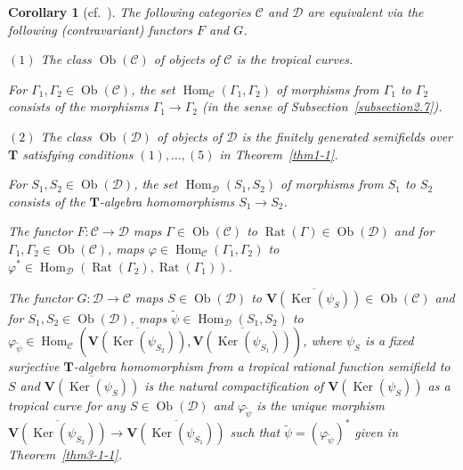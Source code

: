 \documentclass[a4paper,12pt]{amsart}
\newtheorem{cor}[dfn]{Corollary}
\def\Gamma{\varGamma}
\begin{document}
\begin{cor}[cf.~{\cite[Corollary~3.20]{JuAe5}}]
    \label{cor3-1-1}
The following categories $\mathscr{C}$ and $\mathscr{D}$ are equivalent via the following (contravariant) functors $F$ and $G$.

$(1)$ The class $\operatorname{Ob}(\mathscr{C})$ of objects of $\mathscr{C}$ is the tropical curves.

For $\Gamma_1, \Gamma_2 \in \operatorname{Ob}(\mathscr{C})$, the set $\operatorname{Hom}_{\mathscr{C}}(\Gamma_1, \Gamma_2)$ of morphisms from $\Gamma_1$ to $\Gamma_2$ consists of the morphisms $\Gamma_1 \to \Gamma_2$ (in the sense of Subsection~\ref{subsection2.7}).

$(2)$ The class $\operatorname{Ob}(\mathscr{D})$ of objects of $\mathscr{D}$ is the finitely generated semifields over $\boldsymbol{T}$ satisfying conditions $(1), \ldots, (5)$ in Theorem~\ref{thm1-1}.

For $S_1, S_2 \in \operatorname{Ob}(\mathscr{D})$, the set $\operatorname{Hom}_{\mathscr{D}}(S_1, S_2)$ of morphisms from $S_1$ to $S_2$ consists of the $\boldsymbol{T}$-algebra homomorphisms $S_1 \to S_2$.

The functor $F \colon \mathscr{C} \to \mathscr{D}$ maps $\Gamma \in \operatorname{Ob}(\mathscr{C})$ to $\operatorname{Rat}(\Gamma) \in \operatorname{Ob}(\mathscr{D})$ and for $\Gamma_1, \Gamma_2 \in \operatorname{Ob}(\mathscr{C})$, maps $\varphi \in \operatorname{Hom}_{\mathscr{C}}(\Gamma_1, \Gamma_2)$ to $\varphi^{\ast} \in \operatorname{Hom}_{\mathscr{D}}(\operatorname{Rat}(\Gamma_2), \operatorname{Rat}(\Gamma_1))$.

The functor $G \colon \mathscr{D} \to \mathscr{C}$ maps $S \in \operatorname{Ob}(\mathscr{D})$ to $\overline{\boldsymbol{V}(\operatorname{Ker}(\psi_S))} \in \operatorname{Ob}(\mathscr{C})$ and for $S_1, S_2 \in \operatorname{Ob}(\mathscr{D})$, maps $\widetilde{\psi} \in \operatorname{Hom}_{\mathscr{D}}(S_1, S_2)$ to $\varphi_{\widetilde{\psi}} \in \operatorname{Hom}_{\mathscr{C}}(\overline{\boldsymbol{V}(\operatorname{Ker}(\psi_{S_2}))}, \overline{\boldsymbol{V}(\operatorname{Ker}(\psi_{S_1}))})$, where $\psi_S$ is a fixed surjective $\boldsymbol{T}$-algebra homomorphism from a tropical rational function semifield to $S$ and $\overline{\boldsymbol{V}(\operatorname{Ker}(\psi_S))}$ is the natural compactification of $\boldsymbol{V}(\operatorname{Ker}(\psi_S))$ as a tropical curve for any $S \in \operatorname{Ob}(\mathscr{D})$ and $\varphi_{\widetilde{\psi}}$ is the unique morphism $\overline{\boldsymbol{V}(\operatorname{Ker}(\psi_{S_2}))} \to \overline{\boldsymbol{V}(\operatorname{Ker}(\psi_{S_1}))}$ such that $\widetilde{\psi} = \left(\varphi_{\widetilde{\psi}}\right)^{\ast}$ given in Theorem~\ref{thm3-1-1}.
\end{cor}
\end{document}
